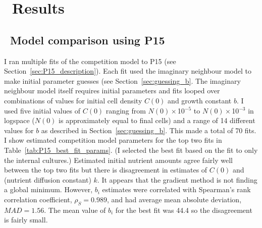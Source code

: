 \graphicspath{{images/}}

\section{\thesection~Results}
\label{sec:results}






\subsection{\thesubsection~Model comparison using P15}
\label{sec:P15_fit}

I ran multiple fits of the competition model to P15 (see
Section~\ref{sec:P15_description}). Each fit used the imaginary
neighbour model to make initial parameter guesses (see
Section~\ref{sec:guessing_b}. The imaginary neighbour model itself
requires initial parameters and fits looped over combinations of
values for initial cell density \(C(0)\) and growth constant \(b\). I
used five initial values of \(C(0)\) ranging from
\(N(0)\times\)10\(^{-5}\) to \(N(0)\times\)10\(^{-3}\) in logspace
(\(N(0)\) is approximately equal to final cells) and a range of 14
different values for \(b\) as described in
Section~\ref{sec:guessing_b}. This made a total of 70 fits. I show
estimated competition model parameters for the top two fits in
Table~\ref{tab:P15_best_fit_params}. (I selected the best fit based on
the fit to only the internal cultures.) Estimated initial nutrient
amounts agree fairly well between the top two fits but there is
disagreement in estimates of \(C(0)\) and (nutrient diffusion
constant) \(k\). It appears that the gradient method is not finding a
global minimum. However, \(b_{i}\) estimates were correlated with
Spearman's rank correlation coefficient, \(\rho_{S} = 0.989\), and had
average mean absolute deviation, \(MAD = 1.56\). The mean value of
\(b_{i}\) for the best fit was 44.4 so the disagreement is fairly
small.

